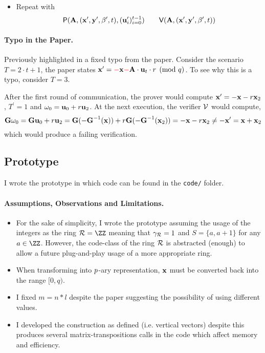 \begin{itemize}
\begin{itemize}
		\item Repeat with
			\[
				\prove(\vA,(\vx^\prime,\vy^\prime,\beta^\prime,t), (\vu[i]^\prime)_{i=0}^{t-1})
				\qquad
				\verify(\vA,(\vx^\prime,\vy^\prime,\beta^\prime,t))
			\]
	\end{itemize}
	
\end{itemize}

\vspace{5mm}

\paragraph{Typo in the Paper.}
Previously highlighted in  a fixed typo from the paper.
%
Consider the scenario $ T= 2\cdot t+1$, the paper states
$\vx^\prime = \red{-}\vx\red{-}\vA\cdot\vu[t]\cdot r \pmod{q}$.
To see why this is a typo, consider $T=3$.

After the first round of communication, the prover would compute $\vx^\prime = -\vx- r \vx[2]$,
$T^\prime=1$ and $\witness[0] = \vu[0] + r\vu[2]$.
At the next execution, the verifier $\mathcal{V}$ would compute,
\[\vG\witness[0] = \vG \vu[0] + r \vu[2] =
\vG ( - \vGi(\vx)) + r \vG ( - \vGi(\vx[2]))= - \vx - r \vx[2] \neq -\vx^\prime = \vx + \vx[2]\] 
which would produce a failing verification.



\clearpage
\subsection{Prototype}

I wrote the prototype in  which code can be found in the \texttt{code/} folder.

\paragraph{Assumptions, Observations and Limitations.}
\begin{itemize}
	\item For the sake of simplicity, I wrote the prototype assuming the usage of the integers
		as the ring $\Rring = \ZZ$ meaning that $\gammaR = 1$ and $S = \{a,a+1\}$ for any $a \in \ZZ$.
		However, the code-class of the ring $\Rring$ is abstracted (enough) to allow a
		future plug-and-play usage of a more appropriate ring.
		
	\item When transforming into $p$-ary representation, $\vx$ must be converted
		back into the range $[0,q)$.
	
	\item I fixed $m = n*l$ despite the paper suggesting the possibility of using different values.
	
	\item I developed the construction as defined (i.e. vertical vectors) despite this produces
		several matrix-transpositions calls in the code which affect memory and efficiency.
\end{itemize}



